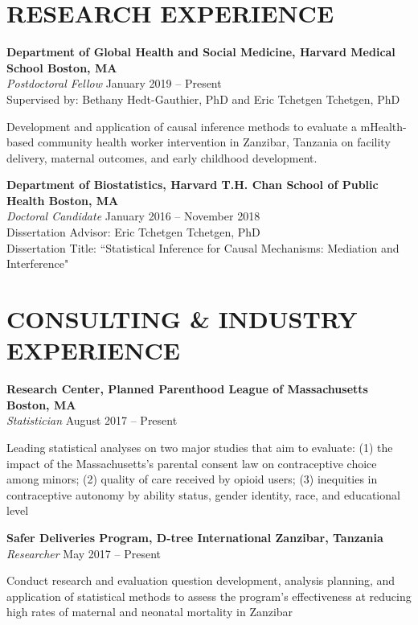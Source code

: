 \documentclass[12pt]{article}
\begin{document}
\section*{\textbf{{\large R}ESEARCH {\large E}XPERIENCE }}

\textbf{Department of Global Health and Social Medicine, Harvard Medical School \hfill \hfill Boston, MA} \\
\textit{Postdoctoral Fellow} \hfill \hfill January 2019 -- Present \\
Supervised by: Bethany Hedt-Gauthier, PhD and Eric Tchetgen Tchetgen, PhD 
\begin{addmargin}[1em]{2em} {\small Development and application of causal inference methods to evaluate a mHealth-based community health worker intervention in Zanzibar, Tanzania on facility delivery, maternal outcomes, and early childhood development.} \end{addmargin} 
\vspace{.2cm}
\textbf{Department of Biostatistics, Harvard T.H. Chan School of Public Health \hfill \hfill Boston, MA} \\
\textit{Doctoral Candidate}  \hfill \hfill January 2016 -- November 2018 \\
Dissertation Advisor: Eric Tchetgen Tchetgen, PhD \\
Dissertation Title: ``Statistical Inference for Causal Mechanisms: Mediation and Interference" 


\section*{\textbf{{\large C}{ONSULTING} \& {\large I}{NDUSTRY} {\large E}{XPERIENCE}}}
\textbf{Research Center, Planned Parenthood League of Massachusetts \hfill \hfill Boston, MA}  \\
\textit{Statistician} \hfill \hfill August 2017 -- Present 
\begin{addmargin}[1em]{2em} {\small Leading statistical analyses on two major studies that aim to evaluate: (1) the impact of the Massachusetts's parental consent law on contraceptive choice among minors; (2) quality of care received by opioid users; (3) inequities in contraceptive autonomy by ability status, gender identity, race, and educational level} \\ \end{addmargin} 

\textbf{Safer Deliveries Program, D-tree International \hfill \hfill Zanzibar, Tanzania} \\
\textit{Researcher} \hfill \hfill May 2017 -- Present 
\begin{addmargin}[1em]{2em} {\small Conduct research and evaluation question development, analysis planning, and application of statistical methods to assess the program's effectiveness at reducing high rates of maternal and neonatal mortality in Zanzibar} \\ \end{addmargin} 
\end{document}
